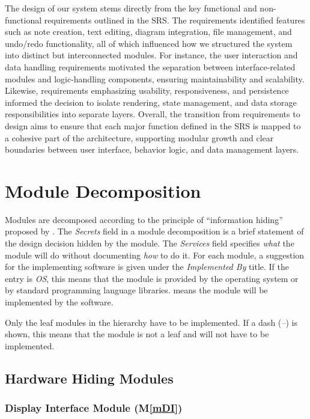 \documentclass[12pt, titlepage]{article}
\newcommand{\mref}[1]{M\ref{#1}}
\begin{document}
The design of our system stems directly from the key functional and non-functional 
requirements outlined in the SRS. The requirements identified features such as note creation, 
text editing, diagram integration, file management, and undo/redo functionality, all of 
which influenced how we structured the system into distinct but interconnected modules. 
For instance, the user interaction and data handling requirements motivated the separation 
between interface-related modules and logic-handling components, ensuring maintainability 
and scalability. Likewise, requirements emphasizing usability, responsiveness, and persistence 
informed the decision to isolate rendering, state management, and data storage responsibilities 
into separate layers. Overall, the transition from requirements to design aims to ensure that 
each major function defined in the SRS is mapped to a cohesive part of the architecture, supporting 
modular growth and clear boundaries between user interface, behavior logic, and data management layers.


\section{Module Decomposition} \label{SecMD}

Modules are decomposed according to the principle of ``information hiding''
proposed by \citet{ParnasEtAl1984}. The \emph{Secrets} field in a module
decomposition is a brief statement of the design decision hidden by the
module. The \emph{Services} field specifies \emph{what} the module will do
without documenting \emph{how} to do it. For each module, a suggestion for the
implementing software is given under the \emph{Implemented By} title. If the
entry is \emph{OS}, this means that the module is provided by the operating
system or by standard programming language libraries.  \emph{\progname{}} means the
module will be implemented by the \progname{} software.

Only the leaf modules in the hierarchy have to be implemented. If a dash
(\emph{--}) is shown, this means that the module is not a leaf and will not have
to be implemented.

\subsection{Hardware Hiding Modules}

\subsubsection{Display Interface Module (\mref{mDI})}
\end{document}
